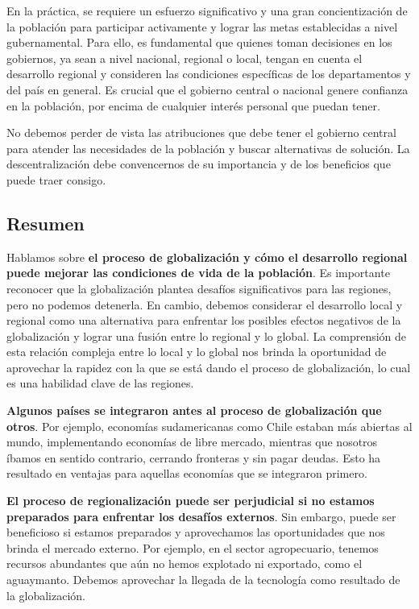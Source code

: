 \documentclass[
  letterpaper,
  DIV=11,
  numbers=noendperiod]{scrartcl}
\begin{document}
En la práctica, se requiere un esfuerzo significativo y una gran
concientización de la población para participar activamente y lograr las
metas establecidas a nivel gubernamental. Para ello, es fundamental que
quienes toman decisiones en los gobiernos, ya sean a nivel nacional,
regional o local, tengan en cuenta el desarrollo regional y consideren
las condiciones específicas de los departamentos y del país en general.
Es crucial que el gobierno central o nacional genere confianza en la
población, por encima de cualquier interés personal que puedan tener.

No debemos perder de vista las atribuciones que debe tener el gobierno
central para atender las necesidades de la población y buscar
alternativas de solución. La descentralización debe convencernos de su
importancia y de los beneficios que puede traer consigo.

\hypertarget{resumen}{%
\subsection{Resumen}\label{resumen}}

Hablamos sobre \textbf{el proceso de globalización y cómo el desarrollo
regional puede mejorar las condiciones de vida de la población}. Es
importante reconocer que la globalización plantea desafíos
significativos para las regiones, pero no podemos detenerla. En cambio,
debemos considerar el desarrollo local y regional como una alternativa
para enfrentar los posibles efectos negativos de la globalización y
lograr una fusión entre lo regional y lo global. La comprensión de esta
relación compleja entre lo local y lo global nos brinda la oportunidad
de aprovechar la rapidez con la que se está dando el proceso de
globalización, lo cual es una habilidad clave de las regiones.

\textbf{Algunos países se integraron antes al proceso de globalización
que otros}. Por ejemplo, economías sudamericanas como Chile estaban más
abiertas al mundo, implementando economías de libre mercado, mientras
que nosotros íbamos en sentido contrario, cerrando fronteras y sin pagar
deudas. Esto ha resultado en ventajas para aquellas economías que se
integraron primero.

\textbf{El proceso de regionalización puede ser perjudicial si no
estamos preparados para enfrentar los desafíos externos}. Sin embargo,
puede ser beneficioso si estamos preparados y aprovechamos las
oportunidades que nos brinda el mercado externo. Por ejemplo, en el
sector agropecuario, tenemos recursos abundantes que aún no hemos
explotado ni exportado, como el aguaymanto. Debemos aprovechar la
llegada de la tecnología como resultado de la globalización.
\end{document}
